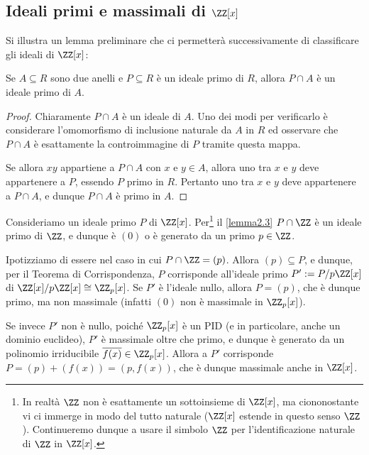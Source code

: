 \documentclass[11pt]{scrartcl}
\begin{document}
	\newpage
	
	\subsection{Ideali primi e massimali di {\texorpdfstring{$\ZZ[x]$}{ℤ[x]}}}
	
	Si illustra un lemma preliminare che ci permetterà successivamente
	di classificare gli ideali di $\ZZ[x]$:
	
	\begin{lemma}
		\label{lemma2.3}
		Se $A \subseteq R$ sono due anelli e $P \subseteq R$ è un ideale primo
		di $R$, allora $P\cap A$ è un ideale primo di $A$.
	\end{lemma}
	
	\begin{proof}
		Chiaramente $P \cap A$ è un ideale di $A$. Uno dei modi per verificarlo è
		considerare l'omomorfismo di inclusione naturale da $A$ in $R$ ed osservare
		che $P \cap A$ è esattamente la controimmagine di $P$ tramite questa
		mappa. \medskip
		

		Se allora $xy$ appartiene a $P \cap A$ con $x$ e $y \in A$, allora
		uno tra $x$ e $y$ deve appartenere a $P$, essendo $P$ primo in
		$R$. Pertanto uno tra $x$ e $y$ deve appartenere a $P \cap A$, e dunque
		$P \cap A$ è primo in $A$.
	\end{proof}
	
	
	Consideriamo un ideale primo $P$ di $\ZZ[x]$. Per\footnote{
		In realtà $\ZZ$ non è esattamente un sottoinsieme di $\ZZ[x]$,
		ma ciononostante vi ci immerge in modo del tutto naturale
		($\ZZ[x]$ estende in questo senso $\ZZ$). Continueremo dunque
		a usare il simbolo $\ZZ$ per l'identificazione naturale di $\ZZ$
		in $\ZZ[x]$.
	} il \autoref{lemma2.3}
	$P \cap \ZZ$ è un ideale primo di $\ZZ$, e dunque è $(0)$ o è generato
	da un primo $p \in \ZZ$. \medskip
	
	
	Ipotizziamo di essere nel caso in cui $P \cap \ZZ = (p)$. Allora $(p) \subseteq P$,
	e dunque, per il Teorema di Corrispondenza, $P$ corrisponde all'ideale primo $P' := P/p\ZZ[x]$
	di $\ZZ[x]/p\ZZ[x] \cong \ZZ_p[x]$. Se $P'$ è l'ideale nullo, allora $P = (p)$,
	che è dunque primo, ma non massimale (infatti $(0)$ non è massimale in $\ZZ_p[x]$). \medskip
	
	Se invece $P'$ non è nullo,
	poiché $\ZZ_p[x]$ è un PID (e in particolare,
	anche un dominio euclideo), $P'$ è massimale oltre che primo, e dunque è generato da un polinomio
	irriducibile $\overline{f(x)} \in \ZZ_p[x]$. Allora a $P'$ corrisponde
	$P = (p) + (f(x)) = (p, f(x))$, che è dunque massimale anche in $\ZZ[x]$. \medskip
	
\end{document}
